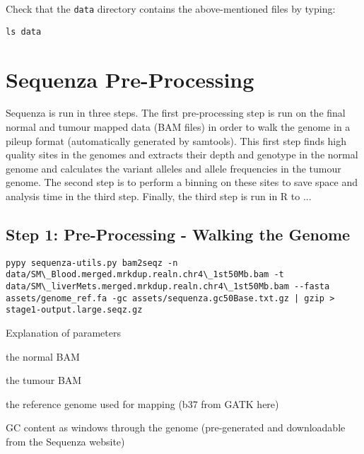 \begin{steps}
Check that the \texttt{data} directory contains the above-mentioned files by typing:
\begin{lstlisting}
ls data
\end{lstlisting}
\end{steps}



\section{Sequenza Pre-Processing}

Sequenza is run in three steps. The first pre-processing step is run on the final normal and tumour mapped data (BAM files) in order to walk the genome in a pileup format (automatically generated by samtools). This first step finds high quality sites in the genomes and extracts their depth and genotype in the normal genome and calculates the variant alleles and allele frequencies in the tumour genome. The second step is to perform a binning on these sites to save space and analysis time in the third step. Finally, the third step is run in R to ...

\subsection{Step 1: Pre-Processing - Walking the Genome}

\begin{steps}
\begin{lstlisting}
pypy sequenza-utils.py bam2seqz -n data/SM\_Blood.merged.mrkdup.realn.chr4\_1st50Mb.bam -t data/SM\_liverMets.merged.mrkdup.realn.chr4\_1st50Mb.bam --fasta assets/genome_ref.fa -gc assets/sequenza.gc50Base.txt.gz | gzip > stage1-output.large.seqz.gz
\end{lstlisting}
\end{steps}

\begin{note}
Explanation of parameters
\begin{description}[style=multiline,labelindent=0cm,align=right,leftmargin=\descriptionlabelspace,rightmargin=1.5cm,font=\ttfamily]
 \item[-n] the normal BAM
 \item[-t] the tumour BAM
 \item[--fasta] the reference genome used for mapping (b37 from GATK here)
 \item[-gc] GC content as windows through the genome (pre-generated and downloadable from the Sequenza website)
\end{description}
\end{note}


